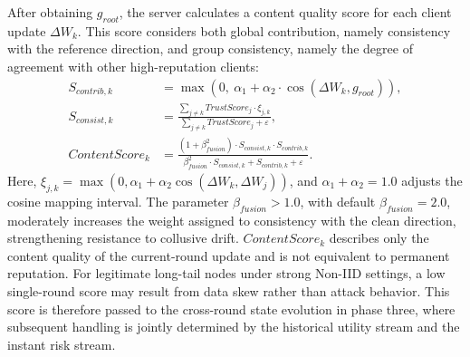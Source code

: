 \documentclass[11pt, a4paper]{article}
\begin{document}
After obtaining $g_{root}$, the server calculates a content quality score for each client update $\Delta W_k$. This score considers both global contribution, namely consistency with the reference direction, and group consistency, namely the degree of agreement with other high-reputation clients:
\begin{align}
    S_{contrib,k}    & = \max\left(0,\ \alpha_{1} + \alpha_{2} \cdot \cos(\Delta W_{k}, g_{root})\right),                                                              \\
    S_{consist,k}    & = \frac{\sum_{j\neq k} TrustScore_{j} \cdot \xi_{j,k}}{\sum_{j\neq k} TrustScore_{j} + \varepsilon},                                            \\
    ContentScore_{k} & = \frac{(1 + \beta_{fusion}^{2}) \cdot S_{consist,k} \cdot S_{contrib,k}}{\beta_{fusion}^{2}\cdot S_{consist,k} + S_{contrib,k} + \varepsilon}.
\end{align}
Here, $\xi_{j,k}=\max(0,\alpha_1+\alpha_2\cos(\Delta W_k,\Delta W_j))$, and $\alpha_1+\alpha_2=1.0$ adjusts the cosine mapping interval. The parameter $\beta_{fusion}>1.0$, with default $\beta_{fusion}=2.0$, moderately increases the weight assigned to consistency with the clean direction, strengthening resistance to collusive drift. $ContentScore_k$ describes only the content quality of the current-round update and is not equivalent to permanent reputation. For legitimate long-tail nodes under strong Non-IID settings, a low single-round score may result from data skew rather than attack behavior. This score is therefore passed to the cross-round state evolution in phase three, where subsequent handling is jointly determined by the historical utility stream and the instant risk stream.
\end{document}
